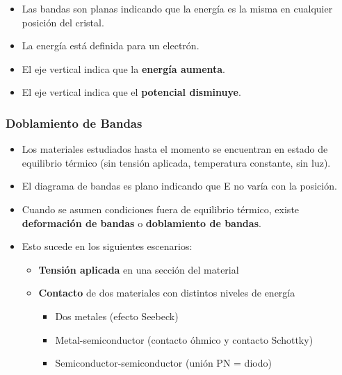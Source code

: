 \documentclass[10pt,t,aspectratio=169]{beamer}
\begin{document}
\begin{frame}[t]
\begin{columns}
\begin{column}{0.5\textwidth}
        \end{column}
        
    \end{columns}
    
    \begin{itemize}
        \item Las bandas son planas indicando que la energía es la misma en cualquier posición del cristal.
        \item La energía está definida para un electrón.
        \item El eje vertical indica que la \textbf{energía aumenta}.
        \item El eje vertical indica que el \textbf{potencial disminuye}.
    \end{itemize}
\end{frame}


\begin{frame}[t]
    \frametitle{Doblamiento de Bandas}

    \begin{itemize}
        \item Los materiales estudiados hasta el momento se encuentran en estado de equilibrio térmico (sin tensión aplicada, temperatura constante, sin luz).
        \item El diagrama de bandas es plano indicando que E no varía con la posición.
        \item Cuando se asumen condiciones fuera de equilibrio térmico, existe \textbf{deformación de bandas} o \textbf{doblamiento de bandas}.
        \item Esto sucede en los siguientes escenarios:
        \begin{itemize}
            \item \textbf{Tensión aplicada} en una sección del material
            \item \textbf{Contacto} de dos materiales con distintos niveles de energía
            \begin{itemize}
                \item Dos metales (efecto Seebeck)
                \item Metal-semiconductor (contacto óhmico y contacto Schottky)
                \item Semiconductor-semiconductor (unión PN = diodo)
            \end{itemize}
        \end{itemize}
    \end{itemize}
\end{frame}
\end{document}
